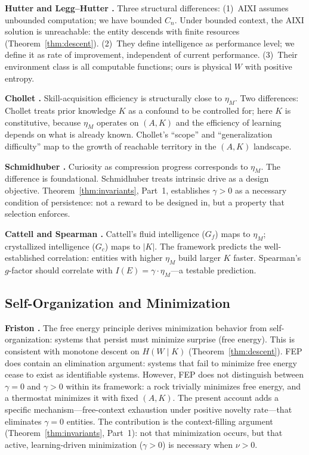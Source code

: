 \documentclass[11pt]{article}
\theoremstyle{definition}
\theoremstyle{remark}
\begin{document}
\textbf{Hutter \cite{Hutter2005} and Legg--Hutter \cite{LeggHutter2007}.}
Three structural differences: (1)~AIXI assumes unbounded computation;
we have bounded $C_n$. Under bounded context, the AIXI solution is
unreachable: the entity descends with finite resources
(Theorem~\ref{thm:descent}). (2)~They define intelligence as
performance level; we define it as rate of improvement, independent of
current performance. (3)~Their environment class is all computable
functions; ours is physical $W$ with positive entropy.

\textbf{Chollet \cite{Chollet2019}.}
Skill-acquisition efficiency is structurally close to $\eta_M$. Two
differences: Chollet treats prior knowledge $K$ as a confound to be
controlled for; here $K$ is constitutive, because $\eta_M$ operates
on $(A, K)$ and the efficiency of learning depends on what is already
known. Chollet's ``scope'' and ``generalization difficulty'' map to the
growth of reachable territory in the $(A, K)$ landscape.

\textbf{Schmidhuber \cite{Schmidhuber2010}.}
Curiosity as compression progress corresponds to $\eta_M$. The
difference is foundational. Schmidhuber treats intrinsic drive as a
design objective. Theorem~\ref{thm:invariants}, Part~1, establishes
$\gamma > 0$ as a necessary condition of persistence: not a reward to
be designed in, but a property that selection enforces.

\textbf{Cattell \cite{Cattell1971} and Spearman \cite{Spearman1904}.}
Cattell's fluid intelligence ($G_f$) maps to $\eta_M$; crystallized
intelligence ($G_c$) maps to $|K|$. The framework predicts the
well-established correlation: entities with higher $\eta_M$ build
larger $K$ faster. Spearman's $g$-factor should correlate with
$I(E) = \gamma \cdot \eta_M$---a testable prediction.

\subsection{Self-Organization and Minimization}

\textbf{Friston \cite{Friston2010, Friston2017}.}
The free energy principle derives minimization behavior from
self-organization: systems that persist must minimize surprise (free
energy). This is consistent with monotone descent on $H(W \mid K)$
(Theorem~\ref{thm:descent}). FEP does contain an elimination
argument: systems that fail to minimize free energy cease to exist as
identifiable systems. However, FEP does not distinguish between
$\gamma = 0$ and $\gamma > 0$ within its framework: a rock trivially
minimizes free energy, and a thermostat minimizes it with fixed
$(A, K)$. The present account adds a specific mechanism---free-context
exhaustion under positive novelty rate---that eliminates $\gamma = 0$
entities. The contribution is the context-filling argument
(Theorem~\ref{thm:invariants}, Part~1): not that minimization occurs,
but that active, learning-driven minimization ($\gamma > 0$) is
necessary when $\nu > 0$.
\end{document}
